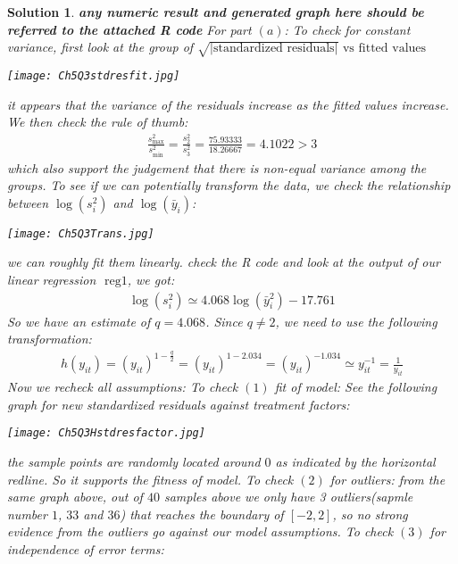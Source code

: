 \documentclass[11pt]{article}
\newtheorem{sol}{Solution}
\begin{document}
\begin{sol}
	{\bf any numeric result and generated graph here should be referred to the attached R code}\vskip 2mm
	For part $(a)$:\vskip 2mm
	To check for constant variance, first look at the group of $\sqrt{|\text{standardized residuals}|} \text{ vs fitted values}$\vskip 2mm
	\begin{center}
		\texttt{[image: Ch5Q3stdresfit.jpg]}
	\end{center}
	it appears that the variance of the residuals increase as the fitted values increase.\vskip 2mm
	We then check the rule of thumb:
	\begin{align*}
		\frac{s^2_{\max}}{s^2_{\min}} = \frac{s^2_{2}}{s^2_{3}} = \frac{75.93333}{18.26667} = 4.1022 >3
	\end{align*}
	which also support the judgement that there is non-equal variance among the groups.\vskip 2mm
	To see if we can potentially transform the data, we check the relationship between $\log(s^2_i)$ and $\log(\bar{y}_i)$:\vskip 2mm
	\begin{center}
		\texttt{[image: Ch5Q3Trans.jpg]}
	\end{center}
	we can roughly fit them linearly. check the R code and look at the output of our linear regression $\text{ reg}1$, we got:
	\begin{align*}
		\log(s_i^2) \simeq 4.068\log(\bar{y}_i^2) - 17.761
	\end{align*}
	So we have an estimate of $q = 4.068$. Since $q \neq 2$, we need to use the following transformation:
	\begin{align*}
		h(y_{it}) = (y_{it})^{1 - \frac{q}{2}} = (y_{it})^{1 - 2.034} =  (y_{it})^{-1.034} \simeq y_{it}^{-1} = \frac{1}{y_{it}}
	\end{align*}
	Now we recheck all assumptions:\vskip 2mm
	To check $(1)$ fit of model:\vskip 2mm
	See the following graph for new standardized residuals against treatment factors:\vskip 2mm
	\begin{center}
		\texttt{[image: Ch5Q3Hstdresfactor.jpg]}
	\end{center}
	the sample points are randomly located around $0$ as indicated by the horizontal redline. So it supports the fitness of model.\vskip 2mm
	To check $(2)$ for outliers:\vskip 2mm
	from the same graph above, out of $40$ samples above we only have 3 outliers(sapmle number $1$, $33$ and $36$) that reaches the boundary of $[-2, 2]$, so no strong evidence from the outliers go against our model assumptions.\vskip 2mm
	To check $(3)$ for independence of error terms:\vskip 2mm

\end{sol}
\end{document}
